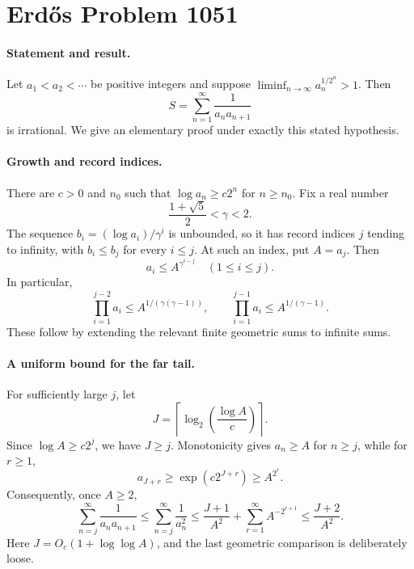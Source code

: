\section*{Erd\H{o}s Problem 1051}

\paragraph{Statement and result.}
Let \(a_1<a_2<\cdots\) be positive integers and suppose
\(\liminf_{n\to\infty}a_n^{1/2^n}>1\).
Then
\[
 S=\sum_{n=1}^{\infty}\frac1{a_na_{n+1}}
\]
is irrational. We give an elementary proof under exactly this stated hypothesis.

\paragraph{Growth and record indices.}
There are \(c>0\) and \(n_0\) such that
\(\log a_n\geq c2^n\) for \(n\geq n_0\).
Fix a real number
\[
 \frac{1+\sqrt5}{2}<\gamma<2.
\]
The sequence \(b_i=(\log a_i)/\gamma^i\) is unbounded, so it has record indices \(j\) tending to infinity, with
\(b_i\leq b_j\) for every \(i\leq j\). At such an index, put \(A=a_j\). Then
\[
 a_i\leq A^{\gamma^{i-j}}\quad(1\leq i\leq j).
 \tag{1}
\]
In particular,
\[
 \prod_{i=1}^{j-2}a_i\leq A^{1/(\gamma(\gamma-1))},
 \qquad
 \prod_{i=1}^{j-1}a_i\leq A^{1/(\gamma-1)}.
 \tag{2}
\]
These follow by extending the relevant finite geometric sums to infinite sums.

\paragraph{A uniform bound for the far tail.}
For sufficiently large \(j\), let
\[
 J=\left\lceil\log_2\!\left(\frac{\log A}{c}\right)\right\rceil.
\]
Since \(\log A\geq c2^j\), we have \(J\geq j\). Monotonicity gives \(a_n\geq A\) for \(n\geq j\), while for \(r\geq1\),
\[
 a_{J+r}\geq\exp(c2^{J+r})\geq A^{2^r}.
\]
Consequently, once \(A\geq2\),
\[
 \sum_{n=j}^{\infty}\frac1{a_na_{n+1}}
 \leq\sum_{n=j}^{\infty}\frac1{a_n^2}
 \leq\frac{J+1}{A^2}+\sum_{r=1}^{\infty}A^{-2^{r+1}}
 \leq\frac{J+2}{A^2}.
 \tag{3}
\]
Here \(J=O_c(1+\log\log A)\), and the last geometric comparison is deliberately loose.


